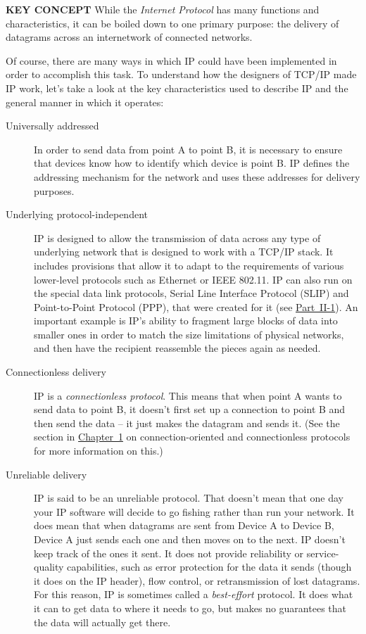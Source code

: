 \documentclass[b5paper,11pt]{memoir}
\begin{document}
{\textbf{KEY CONCEPT}} While the {\emph{Internet Protocol}} has many
functions and characteristics, it can be boiled down to one primary
purpose: the delivery of datagrams across an internetwork of connected
networks.\protect\hypertarget{ch15.htmlux5cux23idx-CHP-15-0638}{}{}

Of course, there are many ways in which IP could have been implemented in order to accomplish this task.
To understand how the designers of TCP/IP made IP work, let's take a look at the key characteristics used to describe IP and the general manner in which it operates:

\begin{description}
   \item[Universally addressed]
      In order to send data from point A to point B, it is necessary to ensure that devices know how to identify which device is point B.
      IP defines the addressing mechanism for the network and uses these addresses for delivery purposes.

   \item[Underlying protocol-independent]
      IP is designed to allow the transmission of data across any type of underlying network that is designed to work with a TCP/IP stack.
      It includes provisions that allow it to adapt to the requirements of various lower-level protocols such as Ethernet or IEEE 802.11.
      IP can also run on the special data link protocols, Serial Line Interface Protocol (SLIP) and Point-to-Point Protocol (PPP), that were created for it (see \protect\hyperlink{pt04.html}{Part~II-1}).
      An important example is IP's ability to fragment large blocks of data into smaller ones in order to match the size limitations of physical networks, and then have the recipient reassemble the pieces again as needed.

   \item[Connectionless delivery]
      IP is a {\emph{connectionless protocol}}.
      This means that when point A wants to send data to point B, it doesn't first set up a connection to point B and then send the data -- it just makes the datagram and sends it.
      (See the section in \protect\hyperlink{ch01.html}{Chapter~1} on connection-oriented and connectionless protocols for more information on this.)

   \item[Unreliable delivery]
      IP is said to be an unreliable protocol.
      That doesn't mean that one day your IP software will decide to go fishing rather than run your network.
      It does mean that when datagrams are sent from Device A to Device B, Device A just sends each one and then moves on to the next.
      IP doesn't keep track of the ones it sent.
      It does not provide reliability or service-quality capabilities, such as error protection for the data it sends (though it does on the IP header), flow control, or retransmission of lost datagrams.
      For this reason, IP is sometimes called a {\emph{best-effort}} protocol.
      It does what it can to get data to where it needs to go, but makes no guarantees that the data will actually get there.


\end{description}
\end{document}
